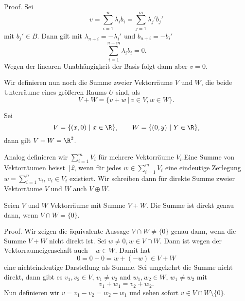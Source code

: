 \begin{emphBox}{}{}
Proof.  Sei
\begin{equation*}
 v = \sum_{i=1}^n \lambda_i b_i = \sum_{j=1}^m \lambda_j' b_j'
\end{equation*}
mit \(b_j' \in B\). Dann gilt mit \(\lambda_{n+i} = -\lambda_i'\) und \(b_{n+i}=-b_i'\)
\begin{equation*}
 \sum_{i=1}^{n+m} \lambda_i b_i = 0.
\end{equation*}
Wegen der linearen Unabhängigkeit der Basis folgt dann aber \(v=0\).
\end{emphBox}

Wir definieren nun noch die Summe zweier Vektorräume \(V\) und \(W\), die beide Unterräume eines größeren Raums \(U\) sind, als
\begin{equation*}
 V+W = \{ v + w ~|~ v \in V, w \in W \}.
\end{equation*}\label{vektorraeume/vektorraeume:example-12}
\begin{example}{}{}



Sei
\begin{equation*}
 V= \{(x,0)~|~x \in  \R \}, \qquad W= \{(0,y)~|~Y \in  \R \},
\end{equation*}
dann gilt  \(V+W = \R^2\).
\end{example}

Analog definieren wir \(\sum_{i=1}^m V_i\) für mehrere Vektorräume   \(V_i\).Eine Summe von Vektorräumen heisst \emph{\textbackslash{}2}, wenn für jedes \(w \in \sum_{i=1}^m V_i\) eine eindeutige Zerlegung\(w=\sum_{i=1}^n v_i\), \(v_i \in V_i\) existiert. Wir schreiben dann für direkte Summe zweier Vektorräume \(V\) und \(W\) auch \(V \oplus W\).
\label{vektorraeume/vektorraeume:lemma-13}
\begin{lemma}{}{}



Seien \(V\) und \(W\) Vektorräume mit Summe \(V+W\). Die Summe ist direkt genau dann, wenn \(V \cap W = \{0\}\).
\end{lemma}

\begin{emphBox}{}{}
Proof.  Wir zeigen die äquivalente Aussage \(V \cap W \neq \{0\}\) genau dann, wenn die Summe \(V+W\) nicht direkt ist. Sei \(w \neq 0, w \in V \cap W\). Dann ist wegen der Vektorraumeigenschaft auch \(-w \in W\). Damit hat
\begin{equation*}
 0  = 0 + 0 = w + (-w) \in V + W
\end{equation*}
eine nichteindeutige Darstellung als Summe. Sei umgekehrt die Summe nicht direkt, dann gibt es \(v_1,v_2 \in V\), \(v_1 \neq v_2\) and \(w_1, w_2 \in W\), \(w_1 \neq w_2\) mit
\begin{equation*}
 v_1 + w_1 = v_2 + w_2.
\end{equation*}
Nun definieren wir \(v = v_1-v_2 = w_2 -w_1\) und sehen sofort \(v \in V\cap W \setminus\{0\}\).
\end{emphBox}


